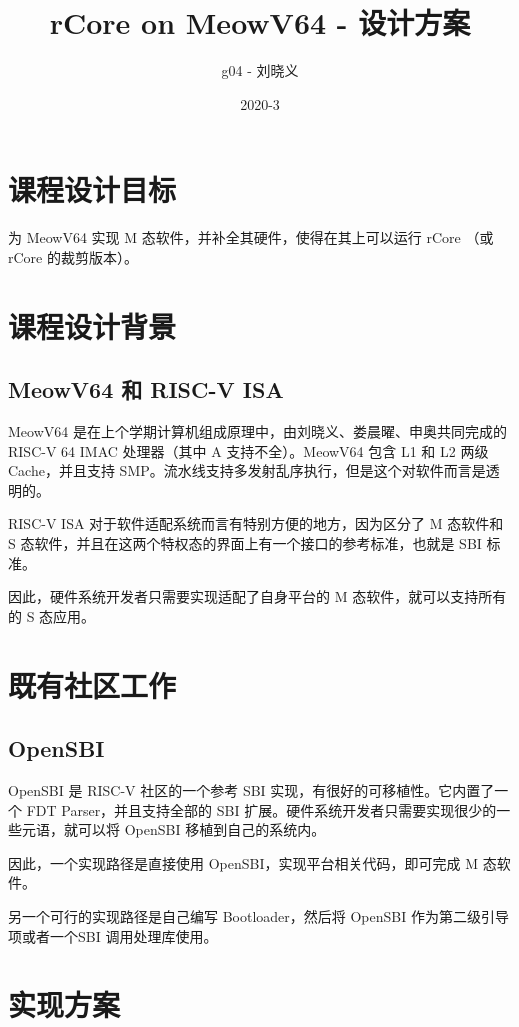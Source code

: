 \documentclass[UTF-8]{ctexart}
\title{rCore on MeowV64 - 设计方案}
\author{g04 - 刘晓义}
\date{2020-3}
\begin{document}
\maketitle

\section{课程设计目标}

为 MeowV64 实现 M 态软件，并补全其硬件，使得在其上可以运行 rCore （或 rCore 的裁剪版本）。

\section{课程设计背景}

\subsection{MeowV64 和 RISC-V ISA}
MeowV64 是在上个学期计算机组成原理中，由刘晓义、娄晨曜、申奥共同完成的 RISC-V 64 IMAC 处理器（其中 A 支持不全）。MeowV64 包含 L1 和 L2 两级 Cache，并且支持 SMP。流水线支持多发射乱序执行，但是这个对软件而言是透明的。

RISC-V ISA 对于软件适配系统而言有特别方便的地方，因为区分了 M 态软件和 S 态软件，并且在这两个特权态的界面上有一个接口的参考标准，也就是 SBI 标准。

因此，硬件系统开发者只需要实现适配了自身平台的 M 态软件，就可以支持所有的 S 态应用。

\section{既有社区工作}
  \subsection{OpenSBI}
  OpenSBI 是 RISC-V 社区的一个参考 SBI 实现，有很好的可移植性。它内置了一个 FDT Parser，并且支持全部的 SBI 扩展。硬件系统开发者只需要实现很少的一些元语，就可以将 OpenSBI 移植到自己的系统内。

  因此，一个实现路径是直接使用 OpenSBI，实现平台相关代码，即可完成 M 态软件。

  另一个可行的实现路径是自己编写 Bootloader，然后将 OpenSBI 作为第二级引导项或者一个SBI 调用处理库使用。
\section{实现方案}
\end{document}
